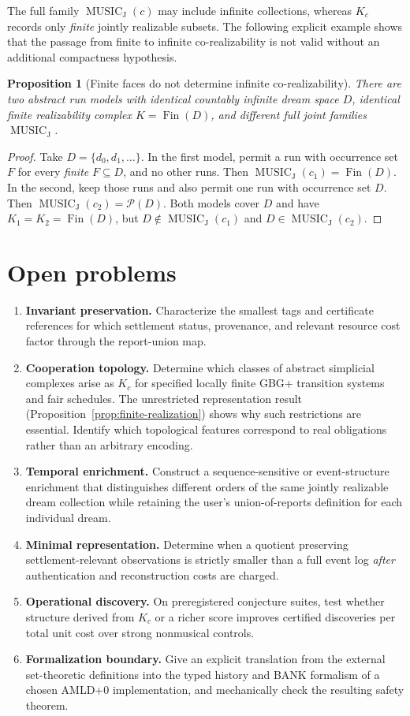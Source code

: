 \documentclass[11pt,letterpaper]{article}
\newtheorem{proposition}[theorem]{Proposition}
\theoremstyle{definition}
\theoremstyle{remark}
\newcommand{\PSet}{\mathcal{P}}
\newcommand{\JMusic}{\operatorname{MUSIC}_{\mathrm J}}
\newcommand{\Fin}{\operatorname{Fin}}
\begin{document}
The full family $\JMusic(c)$ may include infinite collections, whereas $K_c$ records only \emph{finite} jointly realizable subsets. The following explicit example shows that the passage from finite to infinite co-realizability is not valid without an additional compactness hypothesis.


\begin{proposition}[Finite faces do not determine infinite co-realizability]\label{prop:infinite-gap}
There are two abstract run models with identical countably infinite dream space
$D$, identical finite realizability complex $K=\Fin(D)$, and different full
joint families $\JMusic$.
\end{proposition}
\begin{proof}
Take $D=\{d_0,d_1,\ldots\}$. In the first model, permit a run with
occurrence set $F$ for every \emph{finite} $F\subseteq D$, and no other runs.
Then $\JMusic(c_1)=\Fin(D)$. In the second, keep those runs and also permit
one run with occurrence set $D$. Then $\JMusic(c_2)=\PSet(D)$.
Both models cover $D$ and have $K_1=K_2=\Fin(D)$, but
$D\notin\JMusic(c_1)$ and $D\in\JMusic(c_2)$.
\end{proof}

\section{Open problems}
\begin{enumerate}[label=\textbf{O\arabic*.}]
\item \textbf{Invariant preservation.} Characterize the smallest tags and certificate references for which settlement status, provenance, and relevant resource cost factor through the report-union map.
\item \textbf{Cooperation topology.} Determine which classes of abstract simplicial complexes arise as $K_c$ for specified locally finite GBG+ transition systems and fair schedules. The unrestricted representation result (Proposition~\ref{prop:finite-realization}) shows why such restrictions are essential. Identify which topological features correspond to real obligations rather than an arbitrary encoding.
\item \textbf{Temporal enrichment.} Construct a sequence-sensitive or event-structure enrichment that distinguishes different orders of the same jointly realizable dream collection while retaining the user's union-of-reports definition for each individual dream.
\item \textbf{Minimal representation.} Determine when a quotient preserving settlement-relevant observations is strictly smaller than a full event log \emph{after} authentication and reconstruction costs are charged.
\item \textbf{Operational discovery.} On preregistered conjecture suites, test whether structure derived from $K_c$ or a richer score improves certified discoveries per total unit cost over strong nonmusical controls.
\item \textbf{Formalization boundary.} Give an explicit translation from the external set-theoretic definitions into the typed history and BANK formalism of a chosen AMLD+0 implementation, and mechanically check the resulting safety theorem.
\end{enumerate}
\end{document}
